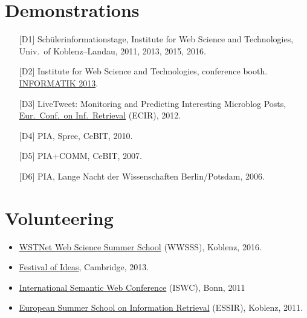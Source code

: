 \documentclass[line,mm]{res}
\newcounter{x}
\begin{document}
\begin{resume}
\section{Demonstrations}
\begin{itemize}
 \item[{[D1]}] 
   Schülerinformationstage, Institute for Web Science and
   Technologies, Univ.\ of Koblenz--Landau, 2011, 2013, 2015, 2016.  
 \item[{[D2]}] Institute for Web Science and Technologies, conference booth.
       \href{http://informatik2013.de}{INFORMATIK 2013}.  
 \item[{[D3]}] 
   LiveTweet: Monitoring and Predicting Interesting Microblog
       Posts, \href{http://ecir2012.upf.edu/}{Eur.\ Conf.\ on Inf.\ Retrieval} (ECIR),
       2012. 
 \item[{[D4]}] PIA, Spree, CeBIT, 2010.
 \item[{[D5]}] 
   PIA+COMM, CeBIT, 2007.
 \item[{[D6]}] PIA, Lange Nacht der Wissenschaften Berlin/Potsdam, 2006. 
\end{itemize}

\section{Volunteering}
\begin{itemize}
  \item \href{http://wwsss16.webscience.org/}{WSTNet Web Science Summer School} (WWSSS), Koblenz, 2016. 
  \item \href{http://www.festivalofideas.cam.ac.uk/}{Festival of Ideas}, Cambridge, 2013. 
  \item \href{http://iswc2011.semanticweb.org/}{International Semantic Web Conference} (ISWC), Bonn, 2011
  \item \href{https://essir.uni-koblenz.de/}{European Summer School on Information Retrieval} (ESSIR), Koblenz, 2011. 
\end{itemize}


\end{resume}
\end{document}
